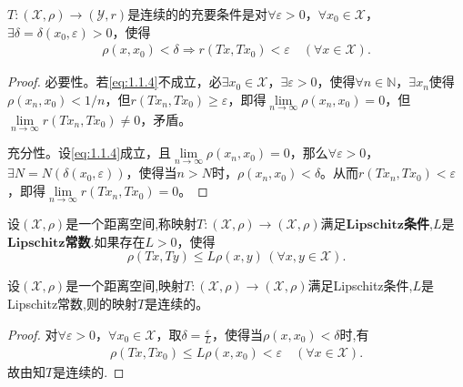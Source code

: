 \documentclass[../../main.tex]{subfiles}
\begin{document}
\begin{proposition}[连续映射充要条件]\label{proposition:距离空间的连续映射充要条件}
$T: (\mathscr{X}, \rho) \to (\mathscr{Y}, r)$是连续的的充要条件是对$\forall \varepsilon > 0$，$\forall x_0 \in \mathscr{X}$，$\exists \delta = \delta(x_0, \varepsilon) > 0$，使得
\begin{align}
\label{eq:1.1.4}
\rho(x, x_0) < \delta \Rightarrow r(Tx, Tx_0) < \varepsilon \quad (\forall x \in \mathscr{X}).
\end{align}
\end{proposition}
\begin{proof}
必要性。若\eqref{eq:1.1.4}不成立，必$\exists x_0 \in \mathscr{X}$，$\exists \varepsilon > 0$，使得$\forall n \in \mathbb{N}$，$\exists x_n$使得$\rho(x_n, x_0) < 1/n$，但$r(Tx_n, Tx_0) \geqslant \varepsilon$，即得$\lim\limits_{n \to \infty} \rho(x_n, x_0) = 0$，但$\lim\limits_{n \to \infty} r(Tx_n, Tx_0) \neq 0$，矛盾。

充分性。设\eqref{eq:1.1.4}成立，且$\lim\limits_{n \to \infty} \rho(x_n, x_0) = 0$，那么$\forall \varepsilon > 0$，$\exists N = N(\delta(x_0, \varepsilon))$，使得当$n > N$时，$\rho(x_n, x_0) < \delta$。从而$r(Tx_n, Tx_0) < \varepsilon$，即得$\lim\limits_{n \to \infty} r(Tx_n, Tx_0) = 0$。
\end{proof}

\begin{definition}
设$(\mathscr{X},\rho)$是一个距离空间,称映射$T:(\mathscr{X},\rho) \to (\mathscr{X},\rho)$满足$\mathbf{Lipschitz}$\textbf{条件},$L$是$\mathbf{Lipschitz}$\textbf{常数}.如果存在$L >0$，使得$$\rho(Tx,Ty) \leqslant L\rho(x,y)\,(\forall x,y \in \mathscr{X}).$$
\end{definition}

\begin{theorem}\label{theorem:满足Lipschitz条件的映射必连续}
设$(\mathscr{X},\rho)$是一个距离空间,映射$T:(\mathscr{X},\rho) \to (\mathscr{X},\rho)$满足Lipschitz条件,$L$是Lipschitz常数,则的映射$T$是连续的。
\end{theorem}
\begin{proof}
对$\forall \varepsilon > 0$，$\forall x_0 \in \mathscr{X}$，取$\delta=\frac{\varepsilon}{L}$，使得当$\rho(x, x_0) < \delta$时,有
\begin{align*}
\rho \left( Tx,Tx_0 \right) \leqslant L\rho \left( x,x_0 \right) <\varepsilon \quad \left( \forall x\in \mathscr{X} \right) .
\end{align*}
故由知$T$是连续的.
\end{proof}
\end{document}
